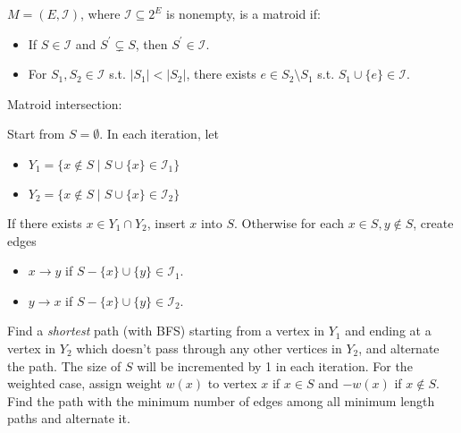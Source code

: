 $M=(E,\mathcal{I})$, where $\mathcal{I} \subseteq 2^E$ is nonempty, is a matroid if:
\begin{itemize}
    \item If $S \in \mathcal{I}$ and $S^\prime \subsetneq S$, then $S^\prime \in \mathcal{I}$.
    \item For $S_1,S_2 \in \mathcal{I}$ s.t. $\lvert S_1 \rvert < \lvert S_2 \rvert$,
        there exists $e \in S_2 \setminus S_1$ s.t. $S_1 \cup \{e\} \in \mathcal{I}$.
\end{itemize}

Matroid intersection:

Start from $S = \emptyset$. In each iteration, let 
\begin{itemize}
    \item $Y_1 = \{x \not\in S \mid S \cup \{x\} \in \mathcal{I}_1 \}$
    \item $Y_2 = \{x \not\in S \mid S \cup \{x\} \in \mathcal{I}_2 \}$
\end{itemize}
If there exists $x \in Y_1 \cap Y_2$, insert $x$ into $S$. Otherwise for each $x \in S, y \not\in S$, create edges
\begin{itemize}
    \item $x \to y$ if $S - \{x\} \cup \{y\} \in \mathcal{I}_1$.
    \item $y \to x$ if $S - \{x\} \cup \{y\} \in \mathcal{I}_2$.
\end{itemize}
Find a \textit{shortest} path (with BFS) starting from a vertex in $Y_1$ and ending at a vertex in $Y_2$ which doesn't pass through any other vertices in $Y_2$, and alternate the path. The size of $S$ will be incremented by 1 in each iteration. For the weighted case, assign weight $w(x)$ to vertex $x$ if $x \in S$ and $-w(x)$ if $x \not\in S$. Find the path with the minimum number of edges among all minimum length paths and alternate it.

